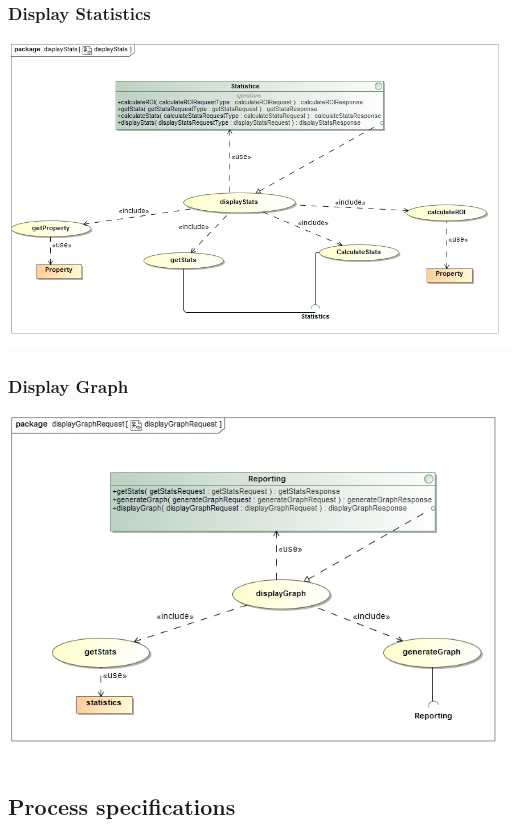 \documentclass[a4paper,12pt]{article}
\begin{document}
\subsubsection{Display Statistics}
\includegraphics[width=1\textwidth]{./Images/requiredFunctionality/displayStatsUseCase.jpg}
\subsubsection{Display Graph}
\includegraphics[width=1\textwidth]{./Images/requiredFunctionality/displayGraphRequestUseCase.jpg}


\subsection{Process specifications}
\end{document}
